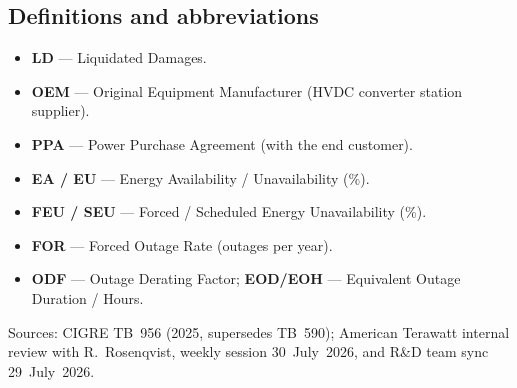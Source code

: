 \subsection{Definitions and abbreviations}
\begin{itemize}\setlength{\itemsep}{0.15em}
  \item \textbf{LD} --- Liquidated Damages.
  \item \textbf{OEM} --- Original Equipment Manufacturer (HVDC converter station supplier).
  \item \textbf{PPA} --- Power Purchase Agreement (with the end customer).
  \item \textbf{EA / EU} --- Energy Availability / Unavailability (\%).
  \item \textbf{FEU / SEU} --- Forced / Scheduled Energy Unavailability (\%).
  \item \textbf{FOR} --- Forced Outage Rate (outages per year).
  \item \textbf{ODF} --- Outage Derating Factor; \textbf{EOD/EOH} --- Equivalent
        Outage Duration / Hours.
\end{itemize}

{\footnotesize Sources: CIGRE TB~956 (2025, supersedes TB~590);
American Terawatt internal review with R.~Rosenqvist, weekly session
30~July~2026, and R\&D team sync 29~July~2026.}
